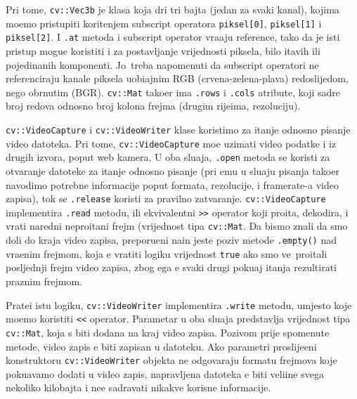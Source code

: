 Pri tome, \lstinline{cv::Vec3b} je klasa koja dr\zh i tri bajta (jedan za svaki kanal), kojima mo\zh emo pristupiti kori\sh tenjem subscript operatora \lstinline{piksel[0]}, \lstinline{piksel[1]} i \lstinline{piksel[2]}. 
I \lstinline{.at} metoda i subscript operator vra\cj aju reference, tako da je isti pristup mogu\cj e koristiti i za postavljanje vrijednosti piksela, bilo \ch itavih ili pojedina\ch nih komponenti. 
Jo\sh\ treba napomenuti da subscript operatori ne referenciraju kanale piksela uobi\ch ajnim RGB (crvena-zelena-plava) redoslijedom, nego obrnutim (BGR). \lstinline{cv::Mat} tako\dj er ima \lstinline{.rows} i 
\lstinline{.cols} atribute, koji sadr\zh e broj redova odnosno broj kolona frejma (drugim rije\ch ima, rezoluciju).

\lstinline{cv::VideoCapture} i \lstinline{cv::VideoWriter} klase koristimo za \ch itanje odnosno pisanje video datoteka. Pri tome, \lstinline{cv::VideoCapture} mo\zh e uzimati video podatke i iz drugih izvora,
poput web kamera. U oba slu\ch aja, \lstinline{.open} metoda se koristi za otvaranje datoteke za \ch itanje odnosno pisanje (pri \ch emu u slu\ch aju pisanja tako\dj er navodimo potrebne informacije poput
formata, rezolucije, i framerate-a video zapisa), tok se \lstinline{.release} koristi za pravilno zatvaranje. \lstinline{cv::VideoCapture} implementira \lstinline{.read} metodu, ili ekvivalentni \lstinline{>>} operator koji
pro\ch ita, dekodira, i vrati naredni nepro\ch itani frejm (vrijednost tipa \lstinline{cv::Mat}. Da bismo znali da smo do\sh li do kraja video zapisa, preporu\ch eni na\ch in jeste poziv metode \lstinline{.empty()} 
nad vra\cj enim frejmom, koja \cj e vratiti logi\ch ku vrijednost \lstinline{true} ako smo ve\cj\ pro\ch itali posljednji frejm video zapisa, zbog \ch ega \cj e svaki drugi poku\sh aj \ch itanja rezultirati praznim frejmom.

Prate\cj i istu logiku, \lstinline{cv::VideoWriter} implementira \lstinline{.write} metodu, umjesto koje mo\zh emo koristiti \lstinline{<<} operator. Parametar u oba slu\ch aja predstavlja vrijednost tipa
\lstinline{cv::Mat}, koja \cj s biti dodana na kraj video zapisa. Pozivom prije spomenute metode, video zapis \cj e biti zapisan u datoteku. Ako parametri proslije\dj eni konstruktoru \lstinline{cv::VideoWriter}
objekta ne odgovaraju formatu frejmova koje poku\sh avamo dodati u video zapis, napravljena datoteka \cj e biti veli\ch ine svega nekoliko kilobajta i ne\cj e sadr\zh avati nikakve korisne informacije.


